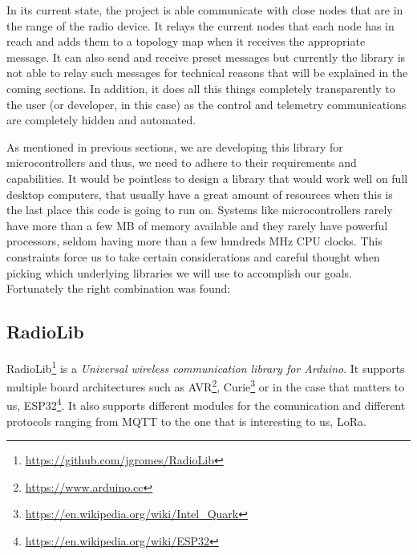 In its current state, the project is able communicate with close nodes that are in the range of the radio device. It relays the current nodes that each node has in reach and adds them to a topology map when it receives the appropriate message. It can also send and receive preset messages but currently the library is not able to relay such messages for technical reasons that will be explained in the coming sections. %
In addition, it does all this things completely transparently to the user (or developer, in this case) as the control and telemetry communications are completely hidden and automated.

As mentioned in previous sections, we are developing this library for microcontrollers and thus, we need to adhere to their requirements and capabilities. It would be pointless to design a library that would work well on full desktop computers, that usually have a great amount of resources when this is the last place this code is going to run on. Systems like microcontrollers rarely have more than a few MB of memory available and they rarely have powerful processors, seldom having more than a few hundreds MHz CPU clocks. %
This constraints force us to take certain considerations and careful thought when picking which underlying libraries we will use to accomplish our goals. Fortunately the right combination was found:
\subsection{RadioLib}
RadioLib\footnote{\url{https://github.com/jgromes/RadioLib}} is a \textit{Universal wireless communication library for Arduino}. It supports multiple board architectures such as AVR\footnote{\url{https://www.arduino.cc}}, Curie\footnote{\url{https://en.wikipedia.org/wiki/Intel_Quark}} or in the case that matters to us, ESP32\footnote{\url{https://en.wikipedia.org/wiki/ESP32}}. It also supports different modules for the comunication and different protocols ranging from MQTT to the one that is interesting to us, LoRa.

